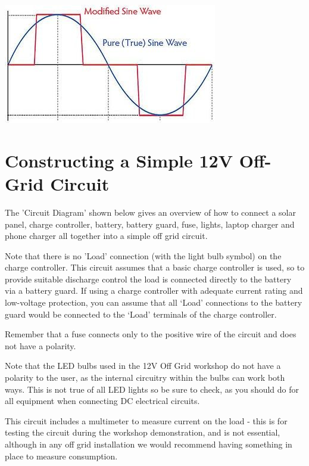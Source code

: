 \documentclass{article}
\theoremstyle{definition}
\theoremstyle{definition}
\theoremstyle{remark}
\begin{document}
    \begin{center}
      \includegraphics[width=0.30\paperwidth]{Images/image_10_2_(sine_wave).png}
    \end{center}
  


\section{Constructing a Simple 12V Off-Grid Circuit} %
\label{sec:constructing_a_simple_12v_off_grid_circuit}

  The 'Circuit Diagram' shown below gives an overview of how to connect a solar panel, charge controller, battery, battery guard, fuse, lights, laptop charger and phone charger all together into a simple off grid circuit. 

  Note that there is no 'Load' connection (with the light bulb symbol) on the charge controller. This circuit assumes that a basic charge controller is used, so to provide suitable discharge control the load is connected directly to the battery via a battery guard. If using a charge controller with adequate current rating and low-voltage protection, you can assume that all ‘Load’ connections to the battery guard would be connected to the ‘Load’ terminals of the charge controller.

  Remember that a fuse connects only to the positive wire of the circuit and does not have a polarity.

  Note that the LED bulbs used in the 12V Off Grid workshop do not have a polarity to the user, as the internal circuitry within the bulbs can work both ways. This is not true of all LED lights so be sure to check, as you should do for all equipment when connecting DC electrical circuits.

  This circuit includes a multimeter to measure current on the load - this is for testing the circuit during the workshop demonstration, and is not essential, although in any off grid installation we would recommend having something in place to measure consumption.
\end{document}
